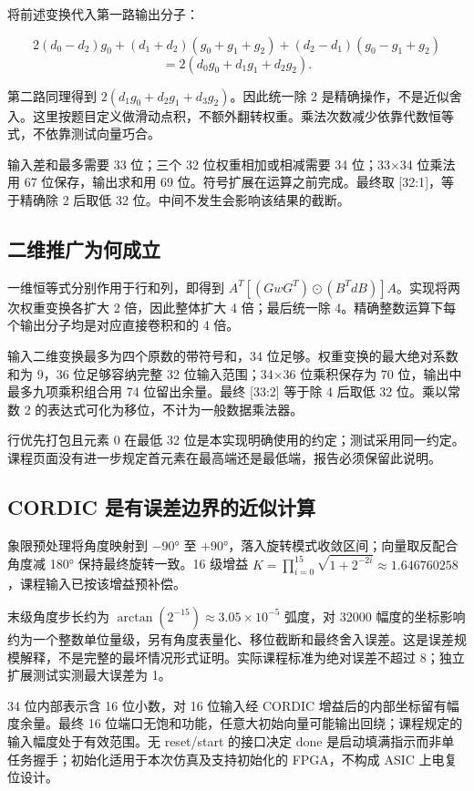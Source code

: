 \documentclass[
  10pt,
  a4paper,
]{article}
\begin{document}
将前述变换代入第一路输出分子：

\[2(d_0-d_2)g_0+(d_1+d_2)(g_0+g_1+g_2)+(d_2-d_1)(g_0-g_1+g_2)\]
\[=2(d_0g_0+d_1g_1+d_2g_2).\]

第二路同理得到 \(2(d_1g_0+d_2g_1+d_3g_2)\)。因此统一除 2
是精确操作，不是近似舍入。这里按题目定义做滑动点积，不额外翻转权重。乘法次数减少依靠代数恒等式，不依靠测试向量巧合。

输入差和最多需要 33 位；三个 32 位权重相加或相减需要 34 位；33×34
位乘法用 67 位保存，输出求和用 69 位。符号扩展在运算之前完成。最终取
{[}32:1{]}，等于精确除 2 后取低 32 位。中间不发生会影响该结果的截断。

\subsection{二维推广为何成立}\label{ux4e8cux7ef4ux63a8ux5e7fux4e3aux4f55ux6210ux7acb}

一维恒等式分别作用于行和列，即得到
\(A^T[(GwG^T)\odot(B^TdB)]A\)。实现将两次权重变换各扩大 2
倍，因此整体扩大 4 倍；最后统一除
4。精确整数运算下每个输出分子均是对应直接卷积和的 4 倍。

输入二维变换最多为四个原数的带符号和，34
位足够。权重变换的最大绝对系数和为 9，36 位足够容纳完整 32
位输入范围；34×36 位乘积保存为 70 位，输出中最多九项乘积组合用 74
位留出余量。最终 {[}33:2{]} 等于除 4 后取低 32 位。乘以常数 2
的表达式可化为移位，不计为一般数据乘法器。

行优先打包且元素 0 在最低 32
位是本实现明确使用的约定；测试采用同一约定。课程页面没有进一步规定首元素在最高端还是最低端，报告必须保留此说明。

\subsection{CORDIC
是有误差边界的近似计算}\label{cordic-ux662fux6709ux8befux5deeux8fb9ux754cux7684ux8fd1ux4f3cux8ba1ux7b97}

象限预处理将角度映射到 −90° 至
+90°，落入旋转模式收敛区间；向量取反配合角度减 180° 保持最终旋转一致。16
级增益
\(K=\prod_{i=0}^{15}\sqrt{1+2^{-2i}}\approx1.646760258\)，课程输入已按该增益预补偿。

末级角度步长约为 \(\arctan(2^{-15})\approx3.05\times10^{-5}\) 弧度，对
32000
幅度的坐标影响约为一个整数单位量级，另有角度表量化、移位截断和最终舍入误差。这是误差规模解释，不是完整的最坏情况形式证明。实际课程标准为绝对误差不超过
8；独立扩展测试实测最大误差为 1。

34 位内部表示含 16 位小数，对 16 位输入经 CORDIC
增益后的内部坐标留有幅度余量。最终 16
位端口无饱和功能，任意大初始向量可能输出回绕；课程规定的输入幅度处于有效范围。无
reset/start 的接口决定 done
是启动填满指示而非单任务握手；初始化适用于本次仿真及支持初始化的
FPGA，不构成 ASIC 上电复位设计。
\end{document}
